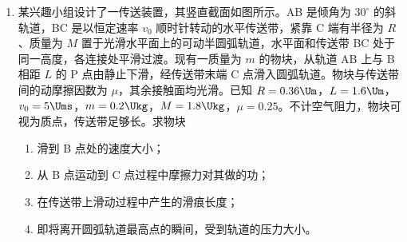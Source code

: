 \documentclass[\gkver]{gaokaozhenti}
\begin{document}
\begin{enumerate}
{压强 $p_{1} = p_{0} = 1.05 \times 10^{5}\UPa$

状态 2 气体的温度 $T_{2} = (27 + 273)\UK = 300\UK$

气体做等容变化，根据 $\frac{p_{1}}{T_{1}} = \frac{p_{2}}{T_{2}}$

可得 $p_{2} = 9 \times 10^{4}\UPa$

（2）气体做等容变化，外界对气体不做功，气体吸收热量为 $Q = -7.35\UJ$

根据热力学第一定律 $\Delta U = W + Q$

可得状态 1 到状态 2 罐内气体内能的变化 $\Delta U = -7.35\UJ$

即气体内能减少 $7.35\UJ$。

（3）罐内外的压强差 $\Delta p = p_{0} - p_{2} = 1.5 \times 10^{4}\UPa$

状态 2 皮肤受到的吸力大小 $F = \Delta pS = 24\UN$
}

\item
某兴趣小组设计了一传送装置，其竖直截面如图所示。AB 是倾角为 $30^{\circ}$ 的斜轨道，BC 是以恒定速率 $v_{0}$ 顺时针转动的水平传送带，紧靠 C 端有半径为 $R$、质量为 $M$ 置于光滑水平面上的可动半圆弧轨道，水平面和传送带 BC 处于同一高度，各连接处平滑过渡。现有一质量为 $m$ 的物块，从轨道 AB 上与 B 相距 $L$ 的 P 点由静止下滑，经传送带末端 C 点滑入圆弧轨道。物块与传送带间的动摩擦因数为 $\mu$，其余接触面均光滑。已知 $R = 0.36\Um$，$L = 1.6\Um$，$v_{0} = 5\Ums$，$m = 0.2\Ukg$，$M = 1.8\Ukg$，$\mu = 0.25$。不计空气阻力，物块可视为质点，传送带足够长。求物块


\begin{enumerate}
	\item
	滑到 B 点处的速度大小；
	\item
	从 B 点运动到 C 点过程中摩擦力对其做的功；
	\item
	在传送带上滑动过程中产生的滑痕长度；
	\item
	即将离开圆弧轨道最高点的瞬间，受到轨道的压力大小。
\end{enumerate}

\jdanswer{
\begin{enumerate}
	\item
	$4\Ums$
	\item
	$0.9\UJ$
	\item
	$0.2\Um$
	\item
	$3\UN$
\end{enumerate}
}
\end{enumerate}
\end{document}
